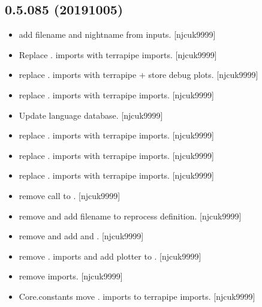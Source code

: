 \documentclass[a4paper,10pt,english]{report}
\begin{document}
\subsection{0.5.085 (2019\sphinxhyphen{}10\sphinxhyphen{}05)}
\label{\detokenize{misc/changelog:id77}}\begin{itemize}
\item {} 
 \sphinxhyphen{} add filename and nightname from
inputs. {[}njcuk9999{]}

\item {} 
Replace . imports with terrapipe imports. {[}njcuk9999{]}

\item {} 
 \sphinxhyphen{} replace . imports with terrapipe + store debug
plots. {[}njcuk9999{]}

\item {} 
 \sphinxhyphen{} replace . imports with terrapipe imports.
{[}njcuk9999{]}

\item {} 
Update language database. {[}njcuk9999{]}

\item {} 
 \sphinxhyphen{} replace . imports with terrapipe imports. {[}njcuk9999{]}

\item {} 
 \sphinxhyphen{} replace . imports with terrapipe imports.
{[}njcuk9999{]}

\item {} 
 \sphinxhyphen{} replace . imports with terrapipe imports. {[}njcuk9999{]}

\item {} 
 \sphinxhyphen{} remove call to
. {[}njcuk9999{]}

\item {} 
 \sphinxhyphen{} remove  and
add filename to reprocess definition. {[}njcuk9999{]}

\item {} 
 \sphinxhyphen{} remove  and add
 and . {[}njcuk9999{]}

\item {} 
 \sphinxhyphen{} remove . imports and add plotter to .
{[}njcuk9999{]}

\item {} 
 \sphinxhyphen{} remove imports. {[}njcuk9999{]}

\item {} 
Core.constants \sphinxhyphen{} move . imports to terrapipe imports. {[}njcuk9999{]}

\end{itemize}
\end{document}
